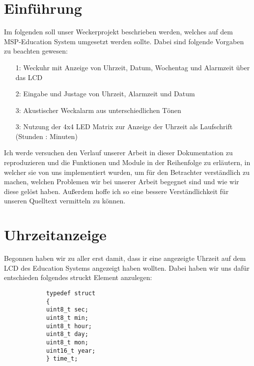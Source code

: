 \documentclass[openright,twoside,11pt,a4paper]{scrartcl}
\begin{document}
	\begin{flushleft}
		\section{Einführung}
		Im folgenden soll unser Weckerprojekt beschrieben werden, welches auf dem MSP-Education System umgesetzt werden sollte. Dabei sind folgende Vorgaben zu beachten gewesen:\\
		\begin{itemize}
			\item[1:] Weckuhr mit Anzeige von Uhrzeit, Datum, Wochentag und Alarmzeit über das LCD
			\item[2:] Eingabe und Justage von Uhrzeit, Alarmzeit und Datum
			\item[3:] Akustischer Weckalarm aus unterschiedlichen Tönen
			\item[3:] Nutzung der 4x4 LED Matrix zur Anzeige der Uhrzeit als Laufschrift (Stunden : Minuten)
		\end{itemize}
		Ich werde versuchen den Verlauf unserer Arbeit in dieser Dokumentation zu reproduzieren und die Funktionen und Module in der Reihenfolge zu erläutern, in welcher sie von uns implementiert wurden, um für den Betrachter verständlich zu machen, welchen Problemen wir bei unserer Arbeit begegnet sind und wie wir diese gelöst haben. Außerdem hoffe ich so eine bessere Verständlichkeit für unseren Quelltext vermitteln zu können. 
		\section{Uhrzeitanzeige}
		Begonnen haben wir zu aller erst damit, dass ir eine angezeigte Uhrzeit auf dem LCD des Education Systems angezeigt haben wollten. Dabei haben wir uns dafür entschieden folgendes struckt Element anzulegen:
		\begin{lstlisting}
			typedef struct
			{
			uint8_t sec;
			uint8_t min;
			uint8_t hour;
			uint8_t day;
			uint8_t mon;
			uint16_t year;
			} time_t;
			

\end{lstlisting}
\end{flushleft}
\end{document}

